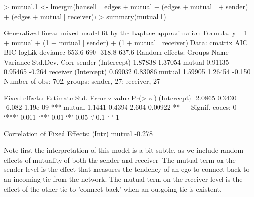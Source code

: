 \documentclass[a4paper]{article}
\begin{document}
\begin{Schunk}
\begin{Sinput}
> mutual.1 <- lmergm(hansell ~ edges + mutual + (edges + mutual | 
+     sender) + (edges + mutual | receiver))
> summary(mutual.1)
\end{Sinput}
\begin{Soutput}
Generalized linear mixed model fit by the Laplace approximation 
Formula: y ~ 1 + mutual + (1 + mutual | sender) + (1 + mutual | receiver) 
   Data: cmatrix 
   AIC BIC logLik deviance
 653.6 690 -318.8    637.6
Random effects:
 Groups   Name        Variance Std.Dev. Corr   
 sender   (Intercept) 1.87838  1.37054         
          mutual      0.91135  0.95465  -0.264 
 receiver (Intercept) 0.69032  0.83086         
          mutual      1.59905  1.26454  -0.150 
Number of obs: 702, groups: sender, 27; receiver, 27

Fixed effects:
            Estimate Std. Error z value Pr(>|z|)    
(Intercept)  -2.0865     0.3430  -6.082 1.19e-09 ***
mutual        1.1441     0.4394   2.604  0.00922 ** 
---
Signif. codes:  0 ‘***’ 0.001 ‘**’ 0.01 ‘*’ 0.05 ‘.’ 0.1 ‘ ’ 1 

Correlation of Fixed Effects:
       (Intr)
mutual -0.278
\end{Soutput}
\end{Schunk}
Note first the interpretation of this model is a bit subtle, as we include random effects of mutuality of both the sender and receiver.
The mutual term on the sender level is the effect that measures the tendency of an ego to connect back to an incoming tie from the network.
The mutual term on the receiver level is the effect of the other tie to 'connect back' when an outgoing tie is existent. \\
\end{document}
